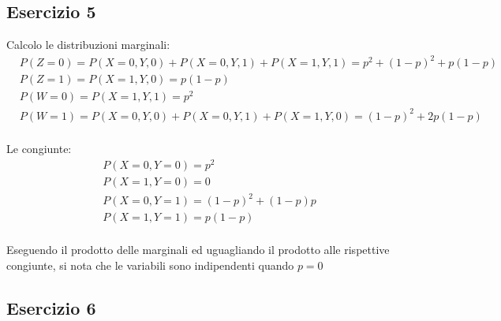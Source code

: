 \documentclass[12pt]{article}
\begin{document}
\subsection*{Esercizio 5}
Calcolo le distribuzioni marginali:
\begin{align*}
    &P(Z=0) = P(X=0,Y,0)+P(X=0,Y,1)+P(X=1,Y,1) = p^2+(1-p)^2+p(1-p) \\
    &P(Z = 1) = P(X=1,Y,0) = p(1-p) \\
    &P(W = 0) = P(X=1,Y,1) = p^2 \\
    &P(W = 1) = P(X=0,Y,0)+P(X=0,Y,1)+P(X=1,Y,0) = (1-p)^2+2p(1-p) \\
\end{align*}

Le congiunte:
\begin{align*}
    &P(X = 0, Y = 0) = p^2 \\
    &P(X = 1, Y = 0) = 0 \\
    &P(X = 0, Y = 1) = (1-p)^2+(1-p)p \\
    &P(X = 1, Y = 1) = p(1-p) \\
\end{align*}

Eseguendo il prodotto delle marginali ed uguagliando il prodotto alle rispettive congiunte, si nota che 
le variabili sono indipendenti quando \(p = 0\)
\subsection*{Esercizio 6}
\end{document}
